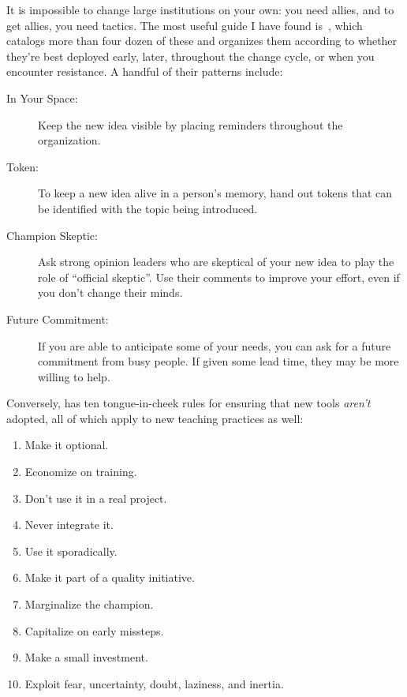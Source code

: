 
It is impossible to change large institutions on your own:
you need allies,
and to get allies,
you need tactics.
The most useful guide I have found is~\cite{Mann2015},
which catalogs more than four dozen of these
and organizes them according to whether they're best deployed early,
later,
throughout the change cycle,
or when you encounter resistance.
A handful of their patterns include:

\begin{description}

\item[In Your Space:]
  Keep the new idea visible
  by placing reminders throughout the organization.

\item[Token:]
  To keep a new idea alive in a person's memory,
  hand out tokens that can be identified with the topic being introduced.

\item[Champion Skeptic:]
  Ask strong opinion leaders who are skeptical of your new idea
  to play the role of ``official skeptic''.
  Use their comments to improve your effort,
  even if you don't change their minds.

\item[Future Commitment:]
  If you are able to anticipate some of your needs,
  you can ask for a future commitment from busy people.
  If given some lead time,
  they may be more willing to help.
  
\end{description}

Conversely,
\cite{Farm2006} has ten tongue-in-cheek rules for ensuring that new tools \emph{aren't} adopted,
all of which apply to new teaching practices as well:

\begin{enumerate}

\item
  Make it optional.

\item
  Economize on training.

\item
  Don't use it in a real project.

\item
  Never integrate it.

\item
  Use it sporadically.

\item
  Make it part of a quality initiative.

\item
  Marginalize the champion.

\item
  Capitalize on early missteps.

\item
  Make a small investment.

\item
  Exploit fear, uncertainty, doubt, laziness, and inertia.

\end{enumerate}

